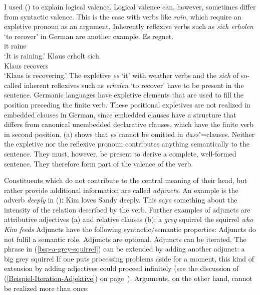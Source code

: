I used () to explain logical valence. Logical valence can, however, sometimes differ from syntactic
valence. This is the case with verbs like \emph{rain}, which
require an expletive pronoun as an argument. 
Inherently reflexive verbs
such as \emph{sich erholen} `to recover' in German are another example. %
\eal
\ex\label{Beispiel-es-regnet}
\gll Es regnet.\\
     it rains\\
\glt `It is raining.'
\ex\label{Beispiel-erholt-sich}
\gll Klaus erholt sich.\\
     Klaus recovers \REFL{}\\
\glt `Klaus is recovering.'
\zl
The expletive \emph{es} `it' with weather verbs and the \emph{sich} of so-called inherent reflexives such as \emph{erholen} `to recover' have to
be present in the sentence. Germanic languages have expletive elements that are used to fill the
position preceding the finite verb. These positional expletives are not realized in embedded clauses in
German, since embedded clauses have a structure that differs from canonical unembedded declarative
clauses, which have the finite verb in second position. (a) shows that \emph{es} cannot
be omitted in \emph{dass}"=clauses.
\eal
{}
\zl
Neither the expletive nor the reflexive pronoun contributes anything semantically to the sentence. They must, however, be present to derive a complete,
well-formed sentence. They therefore form part of the valence of the verb.



Constituents which do not contribute to the central meaning of their head, but rather provide additional information are called \emph{adjuncts}.
An example is the adverb \emph{deeply} in ():
\ea
Kim loves Sandy deeply.
\z
This says something about the intensity of the relation described by the verb. Further examples of
adjuncts are attributive adjectives (a) and relative clauses (b):
\eal
\ex\label{bsp-a-grey-squirrel}
a \emph{grey} squirrel
\ex the squirrel \emph{who Kim feeds}
\zl
Adjuncts have the following syntactic/semantic properties:
\eal
\label{adj-kriterien}
\ex Adjuncts do not fulfil a semantic role.
\ex Adjuncts are optional.
\ex Adjuncts can be iterated.
\zl
The phrase in (\ref{bsp-a-grey-squirrel}) can be extended by adding another adjunct:
\ea
a big grey squirrel
\z
If one puts processing problems aside for a moment, this kind of extension by adding adjectives could proceed infinitely
(see the discussion of (\ref{Beispiel-Iteration-Adjektive}) on page~\pageref{Beispiel-Iteration-Adjektive}). Arguments, on the other hand, cannot be realized
more than once:
\z

